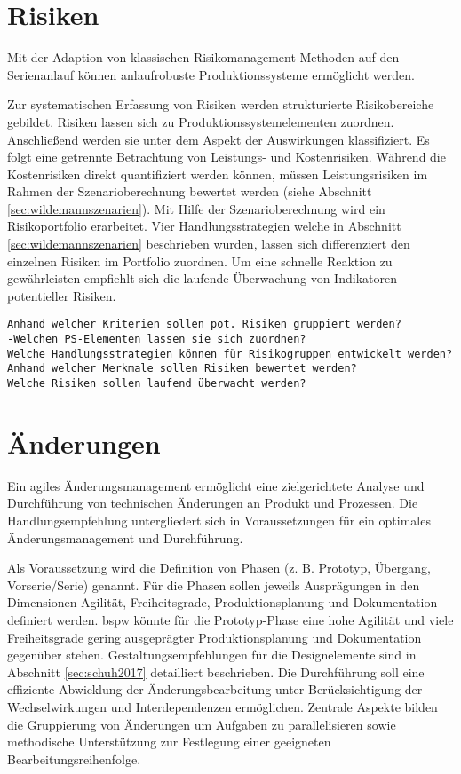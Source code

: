 \section{Risiken}

Mit der Adaption von klassischen Risikomanagement-Methoden auf den Serienanlauf können anlaufrobuste Produktionssysteme ermöglicht werden. 

Zur systematischen Erfassung von Risiken werden strukturierte Risikobereiche gebildet. Risiken lassen sich zu Produktionssystemelementen zuordnen. Anschließend werden sie unter dem Aspekt der Auswirkungen klassifiziert. Es folgt eine getrennte Betrachtung von Leistungs- und Kostenrisiken. 
Während die Kostenrisiken direkt quantifiziert werden können, müssen Leistungsrisiken im Rahmen der Szenarioberechnung bewertet werden (siehe Abschnitt \ref{sec:wildemannszenarien}).
Mit Hilfe der Szenarioberechnung wird ein Risikoportfolio erarbeitet. Vier Handlungsstrategien welche in Abschnitt  \ref{sec:wildemannszenarien} beschrieben wurden, lassen sich differenziert den einzelnen Risiken im Portfolio zuordnen.
Um eine schnelle Reaktion zu gewährleisten empfiehlt sich die laufende Überwachung von Indikatoren potentieller Risiken. 

\begin{verbatim}
Anhand welcher Kriterien sollen pot. Risiken gruppiert werden?
-Welchen PS-Elementen lassen sie sich zuordnen? 
Welche Handlungsstrategien können für Risikogruppen entwickelt werden?
Anhand welcher Merkmale sollen Risiken bewertet werden?
Welche Risiken sollen laufend überwacht werden?
\end{verbatim}

\section{Änderungen}

Ein agiles Änderungsmanagement ermöglicht eine zielgerichtete Analyse und Durchführung von technischen Änderungen an Produkt und Prozessen. Die Handlungsempfehlung untergliedert sich in Voraussetzungen für ein optimales Änderungsmanagement und  Durchführung. %

Als Voraussetzung wird die Definition von Phasen (z. B. Prototyp, Übergang, Vorserie/Serie) genannt. Für die Phasen sollen jeweils Ausprägungen in den Dimensionen Agilität, Freiheitsgrade, Produktionsplanung und Dokumentation definiert werden. \Gls{bspw} könnte für die Prototyp-Phase eine hohe Agilität und viele Freiheitsgrade gering ausgeprägter Produktionsplanung und Dokumentation gegenüber stehen. Gestaltungsempfehlungen für die Designelemente sind in Abschnitt \ref{sec:schuh2017} detailliert beschrieben. 
Die Durchführung soll eine effiziente Abwicklung der Änderungsbearbeitung unter Berücksichtigung der Wechselwirkungen und Interdependenzen ermöglichen. Zentrale Aspekte bilden die Gruppierung von Änderungen um Aufgaben zu parallelisieren sowie methodische Unterstützung zur Festlegung einer geeigneten Bearbeitungsreihenfolge. 

